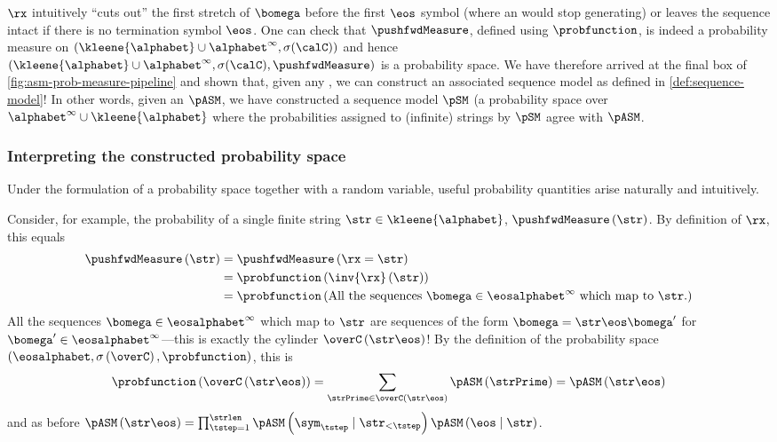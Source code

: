 $\rx$ intuitively ``cuts out'' the first stretch of $\bomega$ before the first $\eos$ symbol (where an \autoregmodelAcronym would stop generating) or leaves the sequence intact if there is no termination symbol $\eos$.
One can check that $\pushfwdMeasure$, defined using $\probfunction$, is indeed a probability measure on $(\kleene{\alphabet}\cup\alphabet^\infty, \sigma(\calC))$ and hence $(\kleene{\alphabet}\cup\alphabet^\infty, \sigma(\calC), \pushfwdMeasure)$ is a probability space. 
We have therefore arrived at the final box of \cref{fig:asm-prob-measure-pipeline} and shown that, given any \autoregmodel, we can construct an associated sequence model as defined in \cref{def:sequence-model}!
In other words, given an \autoregmodelAcronym $\pASM$, we have constructed a sequence model $\pSM$ (a probability space over $\alphabet^\infty \cup \kleene{\alphabet}$ where the probabilities assigned to (infinite) strings by $\pSM$ agree with $\pASM$.

\subsubsection{Interpreting the constructed probability space}
Under the formulation of a probability space together with a random variable, useful probability quantities arise naturally and intuitively. 

Consider, for example, the probability of a single finite string $\str \in \kleene{\alphabet}$, $\pushfwdMeasure\left(\str \right)$.
By definition of $\rx$, this equals
\begin{align}
\pushfwdMeasure\left(\str \right) &= \pushfwdMeasure\left(\rx = \str \right) \\
&= \probfunction\left(\inv{\rx}\left(\str\right)\right) \\
&= \probfunction\left(\text{All the sequences $\bomega\in \eosalphabet^\infty$ which map to $\str$.}\right)
\end{align}
All the sequences $\bomega\in \eosalphabet^\infty$ which map to $\str$ are sequences of the form $\bomega = \str \eos \bomega'$ for $\bomega' \in \eosalphabet^\infty$---this is exactly the cylinder $\overC\left(\str\eos\right)$!
By the definition of the probability space $\left(\eosalphabet, \sigma\left(\overC\right), \probfunction\right)$, this is 
\begin{equation}
\probfunction\left(\overC\left(\str\eos\right)\right) = \sum_{\strPrime \in \overC\left(\str\eos\right)} \pASM\left(\strPrime\right) = \pASM\left(\str \eos\right)
\end{equation}
and as before $\pASM\left(\str \eos\right) = \prod_{\tstep = 1}^{\strlen}\pASM\left(\sym_\tstep\mid\str_{<\tstep}\right)\pASM\left(\eos\mid \str\right)$.

